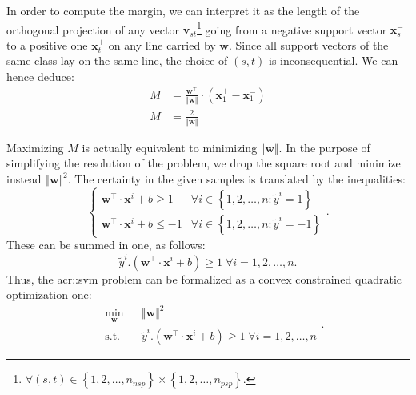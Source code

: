         In order to compute the margin, we can interpret it as the length of the orthogonal projection of any vector $\bm{v}_{st}$\footnote{$\forall (s, t) \in \left\{1, 2, \dots, n_{nsp}\right\} \times \left\{1, 2, \dots, n_{psp}\right\}$.} going from a negative support vector $\bm{x}^-_s$ to a positive one $\bm{x}^+_t$ on any line carried by $\bm{w}$.
        Since all support vectors of the same class lay on the same line, the choice of $(s,t)$ is inconsequential.
        We can hence deduce:
        \begin{align}
            M &= \frac{\bm{w}^\intercal}{\Vert\bm{w}\Vert} \cdot (\bm{x}^+_1 - \bm{x}^-_1) \nonumber \\
            M &= \frac{2}{\Vert\bm{w}\Vert}
        \end{align}

        Maximizing $M$ is actually equivalent to minimizing $\Vert\bm{w}\Vert$.
        In the purpose of simplifying the resolution of the problem, we drop the square root and minimize instead $\Vert\bm{w}\Vert^2$.
        The certainty in the given samples is translated by the inequalities:
        \begin{equation*}
            \begin{cases}
                \bm{w}^\intercal\cdot\bm{x}^i + b \geq 1 & \forall i \in \left\{1, 2, \dots, n: \tilde{y}^i = 1\right\}\\
                \bm{w}^\intercal\cdot\bm{x}^i + b \leq -1 & \forall i \in \left\{1, 2, \dots, n: \tilde{y}^i = -1\right\}
            \end{cases}.
        \end{equation*}
        These can be summed in one, as follows:
        \begin{equation}
            \label{eq::hard_margin}
            \tilde{y}^i.(\bm{w}^\intercal\cdot\bm{x}^i + b) \geq 1 \; \forall i = 1, 2, \dots, n.
        \end{equation}
        Thus, the \gls{acr::svm} problem can be formalized as a convex constrained quadratic optimization one:
        \begin{equation}
            \label{eq::hard_svm_primal}
            \begin{aligned}
                & \min_{\bm{w}}
                & & {\Vert \bm{w} \Vert}^2 \\
                & \text{s.t.}
                & & \tilde{y}^i.(\bm{w}^\intercal\cdot\bm{x}^i + b) \geq 1 \; \forall i = 1, 2, \dots, n
            \end{aligned}.
        \end{equation}

